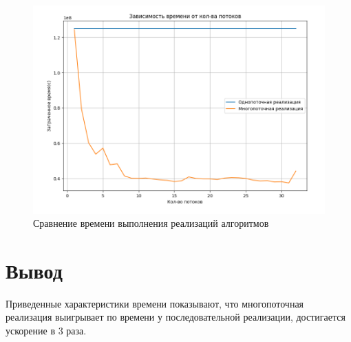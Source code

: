 \begin{figure}[H]
	\begin{center}
		\includegraphics[scale=0.6]{img/time.png}
	\end{center}
	\captionsetup{justification=centering}
	\caption{Сравнение времени выполнения реализаций алгоритмов}
	\label{img:time}
\end{figure}

\section{Вывод}
Приведенные характеристики времени показывают, что многопоточная реализация выигрывает по времени у последовательной реализации, достигается ускорение в 3 раза.